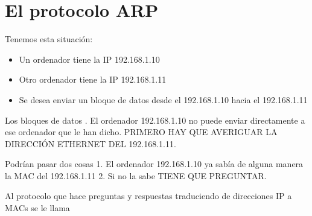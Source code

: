 \documentclass[letterpaper,10pt,spanish]{sphinxmanual}
\begin{document}
\section{El protocolo ARP}
\label{\detokenize{t1_caracterizacion_redes/apuntes_t1:el-protocolo-arp}}
\sphinxAtStartPar
Tenemos esta situación:
\begin{itemize}
\item {} 
\sphinxAtStartPar
Un ordenador tiene la IP 192.168.1.10

\item {} 
\sphinxAtStartPar
Otro ordenador tiene la IP 192.168.1.11

\item {} 
\sphinxAtStartPar
Se desea enviar un bloque de datos desde el 192.168.1.10 hacia el  192.168.1.11

\end{itemize}

\sphinxAtStartPar
Los bloques de datos . El ordenador 192.168.1.10 no puede enviar directamente a ese ordenador que le han dicho. PRIMERO HAY QUE AVERIGUAR LA DIRECCIÓN ETHERNET DEL 192.168.1.11.

\sphinxAtStartPar
Podrían pasar dos cosas
1. El ordenador 192.168.1.10 ya sabía de alguna manera la MAC del 192.168.1.11
2. Si no la sabe TIENE QUE PREGUNTAR.

\sphinxAtStartPar
Al protocolo que hace preguntas y respuestas traduciendo de direcciones IP a MACs se le llama 
\end{document}
